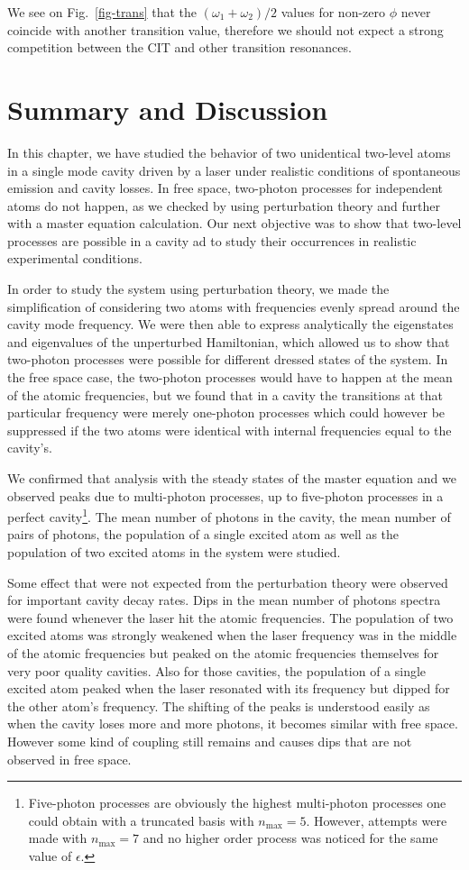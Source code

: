 We see on Fig.~\ref{fig-trans} that the $(\omega_1+\omega_2)/2$ values for non-zero $\phi$ never coincide with another transition value, therefore we should not expect a strong competition between the CIT and other transition resonances.

\section{Summary and Discussion} \label{sec-QEDconcl}

In this chapter, we have studied the behavior of two unidentical two-level atoms in a single mode cavity driven by a laser under realistic conditions of spontaneous emission and cavity losses. In free space, two-photon processes for independent atoms do not happen, as we checked by using perturbation theory and further with a master equation calculation. Our next objective was to show that two-level processes are possible in a cavity ad to study their occurrences in realistic experimental conditions.

In order to study the system using perturbation theory, we made the simplification of considering two atoms with frequencies evenly spread around the cavity mode frequency. We were then able to express analytically the eigenstates and eigenvalues of the unperturbed Hamiltonian, which allowed us to show that two-photon processes were possible for different dressed states of the system. In the free space case, the two-photon processes would have to happen at the mean of the atomic frequencies, but we found that in a cavity the transitions at that particular frequency were merely one-photon processes which could however be suppressed if the two atoms were identical with internal frequencies equal to the cavity's.

We confirmed that analysis with the steady states of the master equation and we observed peaks due to multi-photon processes, up to five-photon processes in a perfect cavity\footnote{Five-photon processes are obviously the highest multi-photon processes one could obtain with a truncated basis with $n_{\mbox{max}}=5$. However, attempts were made with $n_{\mbox{max}}=7$ and no higher order process was noticed for the same value of $\epsilon$.}. The mean number of photons in the cavity, the mean number of pairs of photons, the population of a single excited atom as well as the population of two excited atoms in the system were studied. 

Some effect that were not expected from the perturbation theory were observed for important cavity decay rates. Dips in the mean number of photons spectra were found whenever the laser hit the atomic frequencies. The population of two excited atoms was strongly weakened when the laser frequency was in the middle of the atomic frequencies but peaked on the atomic frequencies themselves for very poor quality cavities. Also for those cavities,  the population of a single excited atom peaked when the laser resonated with its frequency but dipped for the other atom's frequency. The shifting of the peaks is understood easily as when the cavity loses more and more photons, it becomes similar with free space. However some kind of coupling still remains and causes dips that are not observed in free space.


